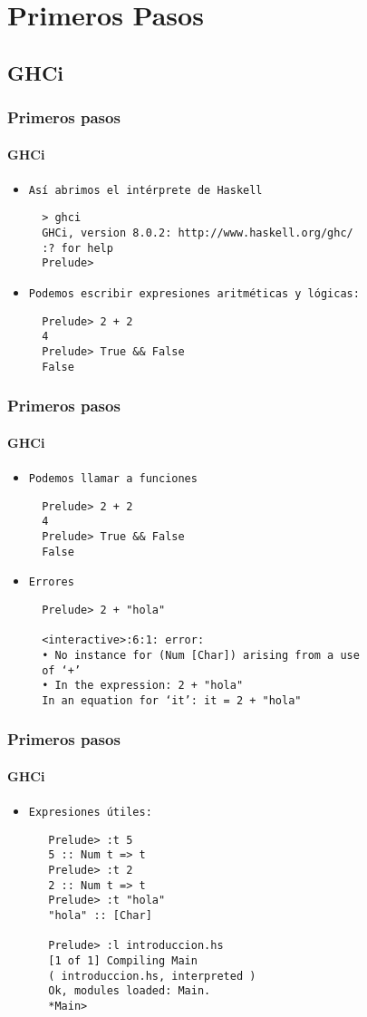 \section{Primeros Pasos}
\subsection{GHCi}
\begin{frame}[fragile]
  \frametitle{Primeros pasos}
  \framesubtitle{GHCi}
  \begin{itemize}
  \item\texttt{Así abrimos el intérprete de Haskell}
    {\color{white}
      \begin{verbatim}
  > ghci
  GHCi, version 8.0.2: http://www.haskell.org/ghc/
  :? for help
  Prelude>
      \end{verbatim}
    }

  \item\texttt{Podemos escribir expresiones aritméticas y lógicas:}
    {\color{white}
      \begin{verbatim}
  Prelude> 2 + 2
  4
  Prelude> True && False
  False
      \end{verbatim}
    }
  \end{itemize}
\end{frame}

\begin{frame}[fragile]
  \frametitle{Primeros pasos}
  \framesubtitle{GHCi}
  \begin{itemize}
  \item\texttt{Podemos llamar a funciones}
    {\color{white}
      \begin{verbatim}
  Prelude> 2 + 2
  4
  Prelude> True && False
  False
      \end{verbatim}
    }

  \item\texttt{Errores}
    {\color{white}
      \begin{verbatim}
  Prelude> 2 + "hola"

  <interactive>:6:1: error:
  • No instance for (Num [Char]) arising from a use
  of ‘+’
  • In the expression: 2 + "hola"
  In an equation for ‘it’: it = 2 + "hola"
      \end{verbatim}
    }
  \end{itemize}
\end{frame}

\begin{frame}[fragile]
  \frametitle{Primeros pasos}
  \framesubtitle{GHCi}
  \begin{itemize}
  \item\texttt{Expresiones útiles:}
    {\color{white}
      \begin{verbatim}
   Prelude> :t 5
   5 :: Num t => t
   Prelude> :t 2
   2 :: Num t => t
   Prelude> :t "hola"
   "hola" :: [Char]

   Prelude> :l introduccion.hs
   [1 of 1] Compiling Main
   ( introduccion.hs, interpreted )
   Ok, modules loaded: Main.
   *Main>
      \end{verbatim}
    }
  \end{itemize}
\end{frame}

